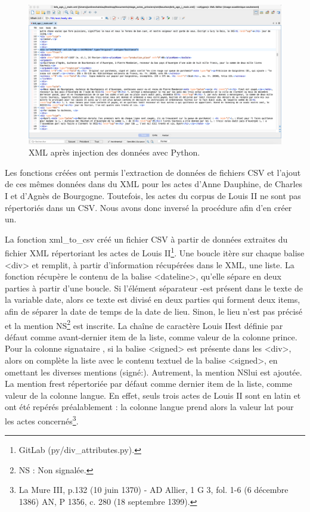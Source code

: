 \begin{figure}[ht]
    \centering
    \includegraphics[scale=0.29]{front/images/injection.png}
    \caption{XML après injection des données avec Python.}
    \label{fig:injection}
\end{figure}

\par Les fonctions créées ont permis l'extraction de données de fichiers CSV et l'ajout de ces mêmes données dans du XML pour les actes d'Anne Dauphine, de Charles I et d'Agnès de Bourgogne. Toutefois, les actes du corpus de Louis II ne sont pas répertoriés dans un CSV. Nous avons donc inversé la procédure afin d'en créer un.
\newline 

\par La fonction xml\_to\_csv créé un fichier CSV à partir de données extraites du fichier XML répertoriant les actes de Louis II\footnote{GitLab (py/div\_attributes.py).}. Une boucle itère sur chaque balise <div> et remplit, à partir d'information récupérées dans le XML, une liste. La fonction récupère le contenu de la balise <dateline>, qu'elle sépare en deux parties à partir d'une boucle. Si l'élément séparateur \og -\fg \space est présent dans le texte de la variable date, alors ce texte est divisé en deux parties qui forment deux items, afin de séparer la date de temps de la date de lieu. Sinon, le lieu n'est pas précisé et la mention \og NS\fg\footnote{NS : Non signalée.} \space est inscrite. La chaîne de caractère \og Louis II\fg \space est définie par défaut comme avant-dernier item de la liste, comme valeur de la colonne \og prince\fg. Pour la colonne \og signataire \fg, si la balise <signed> est présente dans les <div>, alors on complète la liste avec le contenu textuel de la balise <signed>, en omettant les diverses mentions \og (signé:)\fg. Autrement, la mention \og NS\fg \space lui est ajoutée. La mention \og fr\fg \space est répertoriée par défaut comme dernier item de la liste, comme valeur de la colonne \og langue\fg. En effet, seuls trois actes de Louis II sont en latin et ont été repérés préalablement : la colonne langue prend alors la valeur \og lat \fg \space pour les actes concernés\footnote{La Mure III, p.132 (10 juin 1370) - AD Allier, 1 G 3, fol. 1-6 (6 décembre 1386) \newline AN, P 1356, c. 280 (18 septembre 1399).}. 
\newpage 


